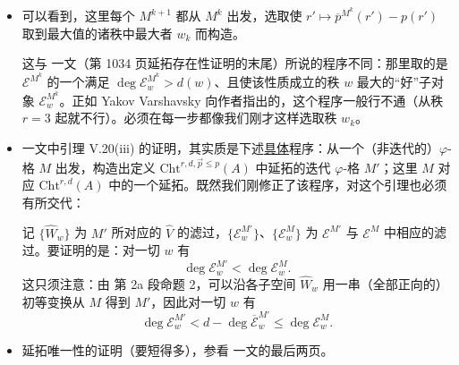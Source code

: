 \begin{remark*}
\begin{itemize}
\item 可以看到，这里每个 $M^{k+1}$ 都从 $M^k$ 出发，选取使 $r' \mapsto \overline{p}^{M^k}(r') - p(r')$ 取到最大值的诸秩中最大者 $w_k$ 而构造。

这与 \cite{lafforgue98} 一文（第 1034 页延拓存在性证明的末尾）所说的程序不同：那里取的是 $\mathcal{E}^{M^k}$ 的一个满足 $\deg \mathcal{E}^{M^k}_w > d(w)$、且使该性质成立的秩 $w$ 最大的“好”子对象 $\mathcal{E}^{M^k}_w$。正如 Yakov Varshavsky 向作者指出的，这个程序一般行不通（从秩 $r = 3$ 起就不行）。必须在每一步都像我们刚才这样选取秩 $w_k$。

\item \cite{lafforgue02} 一文中引理 V.20(iii) 的证明，其实质是下述\underline{具体}程序：从一个（非迭代的）$\varphi$-格 $M$ 出发，构造出定义 $\mathrm{Cht}^{r,d,\vec{p}\le p}(A)$ 中延拓的迭代 $\varphi$-格 $M'$；这里 $M$ 对应 $\mathrm{Cht}^{r,d}(A)$ 中的一个延拓。既然我们刚修正了该程序，对这个引理也必须有所交代：

记 $\{\widehat{W}_w\}$ 为 $M'$ 所对应的 $\widehat{V}$ 的滤过，$\{\mathcal{E}^{M'}_w\}$、$\{\mathcal{E}^M_w\}$ 为 $\mathcal{E}^{M'}$ 与 $\mathcal{E}^M$ 中相应的滤过。要证明的是：对一切 $w$ 有
\[
\deg \mathcal{E}^{M'}_w < \deg \mathcal{E}^M_w.
\]
这只须注意：由 \cite{lafforgue98} 第 2a 段命题 2，可以沿各子空间 $\widehat{W}_w$ 用一串（全部正向的）初等变换从 $M$ 得到 $M'$，因此对一切 $w$ 有
\[
\deg \mathcal{E}^{M'}_w < d - \deg \overline{\mathcal{E}}^{M'}_w \le \deg \mathcal{E}^M_w.
\]

\item 延拓唯一性的证明（要短得多），参看 \cite{lafforgue98} 一文的最后两页。
\end{itemize}
\end{remark*}

